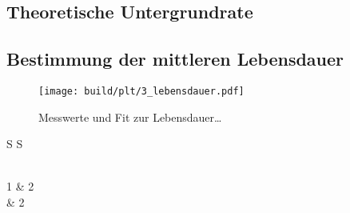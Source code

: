 \subsection{Theoretische Untergrundrate}


\subsection{Bestimmung der mittleren Lebensdauer}
\begin{figure}
    \centering
    \texttt{[image: build/plt/3\_lebensdauer.pdf]}
    \caption{Messwerte und Fit zur Lebensdauer…}
    \label{fig:plt:3_lebensdauer}
\end{figure}


\begin{longtable}{S S}
\caption{My data}
\label{tab:table3}\\
1 & 2 \\
 & 2 \\
\end{longtable}
